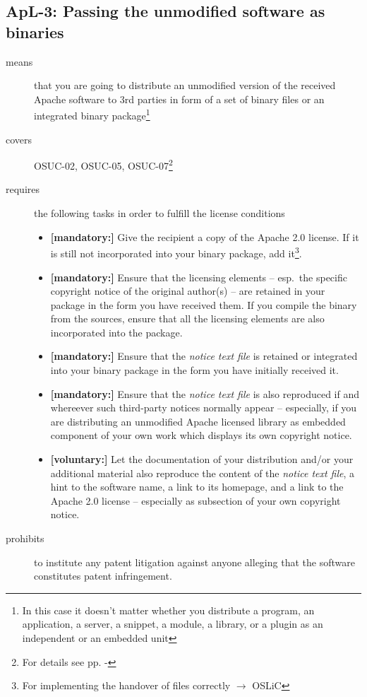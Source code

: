 \subsection{ApL-3: Passing the unmodified software as binaries} 

\begin{description}
\item[means] that you are going to distribute an unmodified version of the
received Apache software to 3rd parties in form of a set of binary files or an
integrated bi\-na\-ry package\footnote{In this case it doesn't matter
whether you  distribute a program, an application, a server, a snippet, a
module, a library, or a plugin as an independent or an embedded unit}

\item[covers] OSUC-02, OSUC-05, OSUC-07\footnote{For details see pp.
\pageref{OSUC-02-DEF} - \pageref{OSUC-07-DEF}}

\item[requires] the following tasks in order to fulfill the license conditions
\begin{itemize}
  \item \textbf{[mandatory:]} Give the recipient a copy of the Apache 2.0
  license. If it is still not incorporated into your binary package, add
  it\footnote{For implementing the handover of files correctly $\rightarrow$
  OSLiC \pageref{DistributingFilesHint}}.
  
  \item \textbf{[mandatory:]} Ensure that the licensing elements -- esp.\ the
  specific copyright notice of the original author(s) -- are retained in your
  package in the form you have received them. If you compile the binary from the
  sources, ensure that all the licensing elements are also incorporated into the
  package.
  \item \textbf{[mandatory:]} Ensure that the \emph{notice text file} is
  retained or integrated into your binary package in the form you have initially
  received
  it.
  \item \textbf{[mandatory:]} Ensure that the \emph{notice text file} is also
  reproduced if and whereever such third-party notices normally appear --
  especially, if you are distributing an unmodified Apache licensed library as
  embedded component of your own work which displays its own copyright notice.
  
  \item \textbf{[voluntary:]} Let the documentation of your distribution and/or
  your additional material also reproduce the content of the \emph{notice text
  file}, a hint to the software name, a link to its homepage, and a link to the
  Apache 2.0 license -- especially as subsection of your own copyright notice.
\end{itemize}

\item[prohibits] to institute any patent litigation against anyone alleging that
the software constitutes patent infringement.

\end{description}

